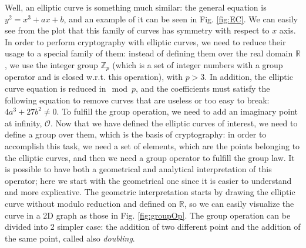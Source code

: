 \documentclass{article}
\begin{document}
 Well, an elliptic curve is something much similar: the general equation is $y^2 = x^3 + ax + b$, and an example of it can be seen in Fig. \ref{fig:EC}. We can easily see from the plot that this family of curves has symmetry with respect to $x$ axis. \newline
 In order to perform cryptography with elliptic curves, we need to reduce their usage to a special family of them: instead of defining them over the real domain $\mathbb{R}$, we use the integer group $\mathbb{Z}_{p}$ (which is a set of integer numbers with a group operator and is closed w.r.t. this operation), with $p > 3$. In addition, the elliptic curve equation is reduced in$\mod p$, and the coefficients must satisfy the following equation to remove curves that are useless or too easy to break: $4a^3 + 27b^2 \ne{0}$. To fulfill the group operation, we need to add an imaginary point at infinity, $\mathcal{O}$. \newline
 Now that we have defined the elliptic curves of interest, we need to define a group over them, which is the basis of cryptography: in order to accomplish this task, we need a set of elements, which are the points belonging to the elliptic curves, and then we need a group operator to fulfill the group law. It is possible to have both a geometrical and analytical interpretation of this operator; here we start with the geometrical one since it is easier to understand and more explicative.
 The geometric interpretation starts by drawing the elliptic curve without modulo reduction and defined on $\mathbb{R}$, so we can easily visualize the curve in a 2D graph as those in Fig. \ref{fig:groupOp}. The group operation can be divided into 2 simpler case: the addition of two different point and the addition of the same point, called also \textit{doubling}. 
 
\end{document}
